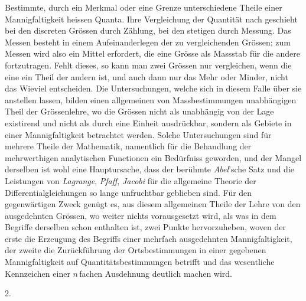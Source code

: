 \documentclass[a4paper,12pt]{article}
\begin{document}
Bestimmte, durch ein Merkmal oder eine Grenze unterschiedene
Theile einer Mannigfaltigkeit heissen Quanta.  Ihre Vergleichung
der Quantit\"{a}t nach geschieht bei den discreten Gr\"{o}ssen
durch Z\"{a}hlung, bei den stetigen durch Messung.  Das Messen
besteht in einem Aufeinanderlegen der zu vergleichenden
Gr\"{o}ssen; zum Messen wird also ein Mittel erfordert, die eine
Gr\"{o}sse als Massstab f\"{u}r die andere fortzutragen.  Fehlt
dieses, so kann man zwei Gr\"{o}ssen nur vergleichen, wenn die
eine ein Theil der andern ist, und auch dann nur das Mehr oder
Minder, nicht das Wieviel entscheiden.  Die Untersuchungen,
welche sich in diesem Falle \"{u}ber sie anstellen lassen, bilden
einen allgemeinen von Massbestimmungen unabh\"{a}ngigen Theil der
Gr\"{o}ssenlehre, wo die Gr\"{o}ssen nicht als unabh\"{a}ngig von
der Lage existirend und nicht als durch eine Einheit
ausdr\"{u}ckbar, sondern als Gebiete in einer Mannigfaltigkeit
betrachtet werden.  Solche Untersuchungen sind f\"{u}r mehrere
Theile der Mathematik, namentlich f\"{u}r die Behandlung der
mehrwerthigen analytischen Functionen ein Bed\"{u}rfniss
geworden, und der Mangel derselben ist wohl eine Hauptursache,
dass der ber\"{u}hmte \emph{Abel}'sche Satz und die Leistungen
von \emph{Lagrange}, \emph{Pfaff}, \emph{Jacobi} f\"{u}r
die allgemeine Theorie der Differentialgleichungen so lange
unfruchtbar geblieben sind.  F\"{u}r den gegenw\"{a}rtigen Zweck
gen\"{u}gt es, aus diesem allgemeinen Theile der Lehre von den
ausgedehnten Gr\"{o}ssen, wo weiter nichts vorausgesetzt wird,
als was in dem Begriffe derselben schon enthalten ist, zwei
Punkte hervorzuheben, woven der erste die Erzeugung des Begriffs
einer mehrfach ausgedehnten Mannigfaltigkeit, der zweite die
Zur\"{u}ckf\"{u}hrung der Ortsbestimmungen in einer gegebenen
Mannigfaltigkeit auf Quantit\"{a}tsbestimmungen betrifft und das
wesentliche Kennzeichen einer $n \,$\-fachen Ausdehnung deutlich
machen wird.

\medbreak

\centerline{2.}

\nobreak\medskip
\end{document}
